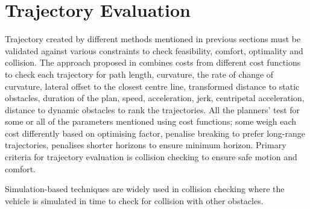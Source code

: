 \section{Trajectory Evaluation}
\label{traj_eval}
Trajectory created by different methods mentioned in previous sections must be validated against various constraints to check feasibility, comfort, optimality and collision. The approach proposed in \cite{traj_planner_optimization} combines costs from different cost functions to check each trajectory for path length, curvature, the rate of change of curvature, lateral offset to the closest centre line, transformed distance to static obstacles, duration of the plan, speed, acceleration, jerk, centripetal acceleration, distance to dynamic obstacles to rank the trajectories. All the planners' test for some or all of the parameters mentioned using cost functions; some weigh each cost differently based on optimising factor, \cite{unit_A_star} penalise breaking to prefer long-range trajectories, \cite{cmu_parallel_thesis} penalises shorter horizons to ensure minimum horizon. Primary criteria for trajectory evaluation is collision checking to ensure safe motion and comfort.

Simulation-based techniques are widely used in collision checking where the vehicle is simulated in time to check for collision with other obstacles.

